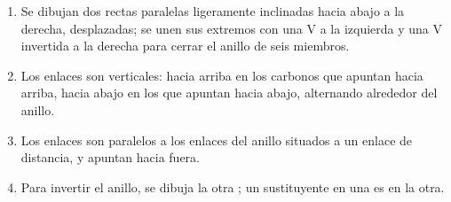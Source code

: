 \begin{method}\label{met:b1:stereochemistry-in-depth:draw-chair}
\begin{enumerate}
  \item Se dibujan dos rectas paralelas ligeramente inclinadas hacia
        abajo a la derecha, desplazadas; se unen sus extremos con una V a
        la izquierda y una V invertida a la derecha para cerrar el anillo
        de seis miembros.
  \item Los enlaces  son verticales: hacia arriba en los carbonos
        que apuntan hacia arriba, hacia abajo en los que apuntan hacia
        abajo, alternando alrededor del anillo.
  \item Los enlaces  son paralelos a los enlaces del anillo
        situados a un enlace de distancia, y apuntan hacia fuera.
  \item Para invertir el anillo, se dibuja la otra ; un sustituyente
         en una es  en la otra.
\end{enumerate}
\end{method}

